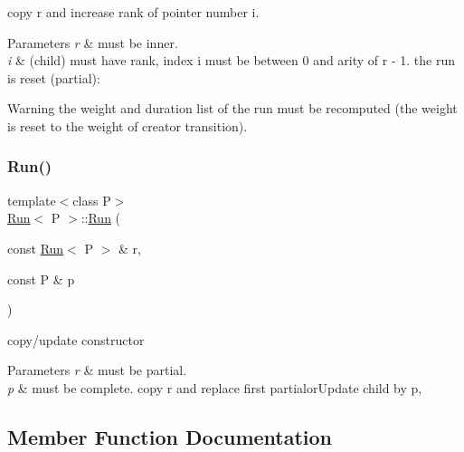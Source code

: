 copy r and increase rank of pointer number i. 


\begin{DoxyParams}{Parameters}
{\em r} & must be inner. \\
\hline
{\em i} & (child) must have rank, index i must be between 0 and arity of r -\/ 1. the run is reset (partial)\+: \\
\hline
\end{DoxyParams}
\begin{DoxyWarning}{Warning}
the weight and duration list of the run must be recomputed (the weight is reset to the weight of creator transition). 
\end{DoxyWarning}
\mbox{\label{classRun_aa0d15ec06ce84a5db17c26922f708d44}} 
\subsubsection{\texorpdfstring{Run()}{Run()}\hspace{0.1cm}{\footnotesize\ttfamily [4/4]}}
{\footnotesize\ttfamily template$<$class P$>$ \\
\mbox{\hyperlink{classRun}{Run}}$<$ P $>$\+::\mbox{\hyperlink{classRun}{Run}} (\begin{DoxyParamCaption}\item[{const \mbox{\hyperlink{classRun}{Run}}$<$ P $>$ \&}]{r,  }\item[{const P \&}]{p }\end{DoxyParamCaption})}



copy/update constructor 


\begin{DoxyParams}{Parameters}
{\em r} & must be partial. \\
\hline
{\em p} & must be complete. copy r and replace first partialor\+Update child by p, \\
\hline
\end{DoxyParams}


\subsection{Member Function Documentation}
\mbox{\label{classRun_a17781141b67e9cd2675c0dad722de2ec}} 
